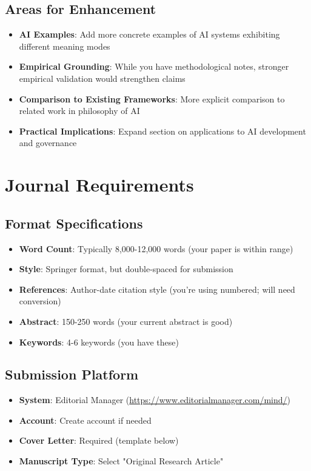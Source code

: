 \documentclass[12pt]{article}
\begin{document}
\subsection{Areas for Enhancement}

\begin{itemize}[leftmargin=*]
\item \textbf{AI Examples}: Add more concrete examples of AI systems exhibiting different meaning modes
\item \textbf{Empirical Grounding}: While you have methodological notes, stronger empirical validation would strengthen claims
\item \textbf{Comparison to Existing Frameworks}: More explicit comparison to related work in philosophy of AI
\item \textbf{Practical Implications}: Expand section on applications to AI development and governance
\end{itemize}

\section{Journal Requirements}

\subsection{Format Specifications}

\begin{itemize}[leftmargin=*]
\item \textbf{Word Count}: Typically 8,000-12,000 words (your paper is within range)
\item \textbf{Style}: Springer format, but double-spaced for submission
\item \textbf{References}: Author-date citation style (you're using numbered; will need conversion)
\item \textbf{Abstract}: 150-250 words (your current abstract is good)
\item \textbf{Keywords}: 4-6 keywords (you have these)
\end{itemize}

\subsection{Submission Platform}

\begin{itemize}[leftmargin=*]
\item \textbf{System}: Editorial Manager (\url{https://www.editorialmanager.com/mind/})
\item \textbf{Account}: Create account if needed
\item \textbf{Cover Letter}: Required (template below)
\item \textbf{Manuscript Type}: Select "Original Research Article"
\end{itemize}
\end{document}
